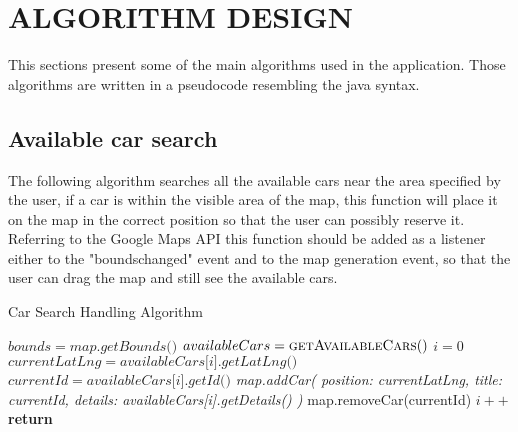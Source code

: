 \section{ALGORITHM DESIGN}

This sections present some of the main algorithms used in the application. Those algorithms are written
in a pseudocode resembling the java syntax.

\subsection{Available car search}
The following algorithm searches all the available cars near the area specified by the user, if a car
is within the visible area of the map, this function will place it on the map in the correct position
so that the user can possibly reserve it. Referring to the Google Maps API this function should be
added as a listener either to the "bounds\textunderscore changed" event and to the map generation event,
so that the user can drag the map and still see the available cars.

\begin{algorithm}
\begin{algorithmic}[1]
  \caption{\label{alg:stdreqhandler} Car Search Handling Algorithm}

    \State $ bounds = \textit{map.getBounds()} $
    \State $ availableCars = \Call {getAvailableCars} $
    \State $ i = \textit{0}$
      \State $ currentLatLng = \textit{availableCars[i].getLatLng()} $
      \State $ currentId = \textit{availableCars[i].getId()} $
        \State \textit{map.addCar(
          \State position: currentLatLng,
          \State title: currentId,
          \State details: availableCars[i].getDetails()
        \State )}
        \State map.removeCar(currentId)
      \EndIf
      \State $ i++ $
    \EndFor
    \State \textbf{return}
  \EndFunction

\end{algorithmic}
\end{algorithm}

